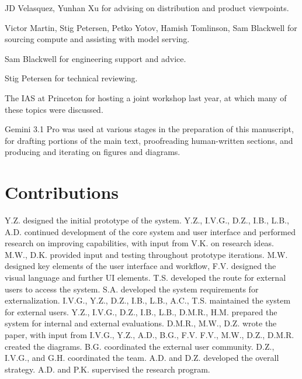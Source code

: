 \documentclass[11pt, a4paper, copyright, gdm]{google}
\begin{document}
JD Velasquez, Yunhan Xu for advising on distribution and product viewpoints.

Victor Martin, Stig Petersen, Petko Yotov, Hamish Tomlinson, Sam Blackwell for sourcing compute and assisting with model serving.

Sam Blackwell for engineering support and advice.

Stig Petersen for technical reviewing.

The IAS at Princeton for hosting a joint workshop last year, at which many of these topics were discussed.

Gemini 3.1 Pro was used at various stages in the preparation of this manuscript, for drafting portions of the main text, proofreading human-written sections, and producing and iterating on figures and diagrams.

\section*{Contributions}

Y.Z. designed the initial prototype of the system. 
Y.Z., I.V.G., D.Z., I.B., L.B., A.D. continued development of the core system and user interface and performed research on improving capabilities, with input from V.K. on research ideas.
M.W., D.K. provided input and testing throughout prototype iterations.
M.W. designed key elements of the user interface and workflow, F.V. designed the visual language and further UI elements.
T.S. developed the route for external users to access the system.
S.A. developed the system requirements for externalization.
I.V.G., Y.Z., D.Z., I.B., L.B., A.C., T.S. maintained the system for external users.
Y.Z., I.V.G., D.Z., I.B., L.B., D.M.R., H.M. prepared the system for internal and external evaluations.
D.M.R., M.W., D.Z. wrote the paper, with input from I.V.G., Y.Z., A.D., B.G., F.V.
F.V., M.W., D.Z., D.M.R. created the diagrams.
B.G. coordinated the external user community.
D.Z., I.V.G., and G.H. coordinated the team.
A.D. and D.Z. developed the overall strategy.
A.D. and P.K. supervised the research program.

\printbibliography
\end{document}
